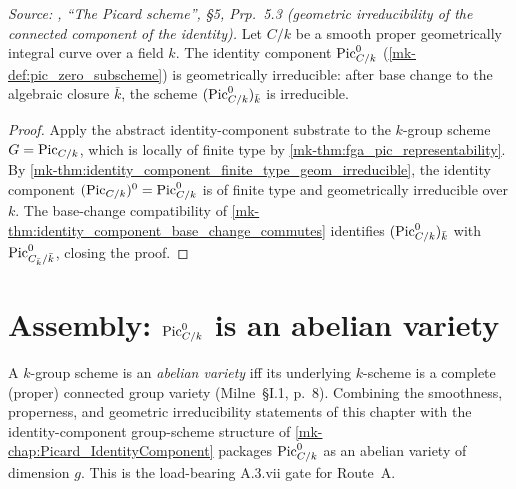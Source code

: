 \begin{theorem}\label{mk-thm:pic0_geom_irred}
  \leanok

  \textit{Source: \cite{kleiman-picard}, ``The Picard scheme'', \S 5, Prp.~5.3
  (geometric irreducibility of the connected component of the
  identity).}
  Let \(C/k\) be a smooth proper geometrically integral curve over a
  field \(k\). The identity component \(\operatorname{Pic}^0_{C/k}\)
  (\ref{mk-def:pic_zero_subscheme}) is geometrically irreducible: after
  base change to the algebraic closure \(\bar k\), the scheme
  \((\operatorname{Pic}^0_{C/k})_{\bar k}\) is irreducible.
\end{theorem}

\begin{proof}
  \leanok{}
  Apply the abstract identity-component substrate to the \(k\)-group
  scheme \(G = \operatorname{Pic}_{C/k}\), which is locally of finite type by
  \ref{mk-thm:fga_pic_representability}. By
  \ref{mk-thm:identity_component_finite_type_geom_irreducible}, the
  identity component \((\operatorname{Pic}_{C/k})^0 = \operatorname{Pic}^0_{C/k}\) is of finite
  type and geometrically irreducible over \(k\). The base-change
  compatibility of
  \ref{mk-thm:identity_component_base_change_commutes} identifies
  \((\operatorname{Pic}^0_{C/k})_{\bar k}\) with \(\operatorname{Pic}^0_{C_{\bar k}/\bar k}\),
  closing the proof.
\end{proof}

\section{Assembly: \(\operatorname{Pic}^0_{C/k}\) is an abelian variety}
\label{mk-sec:pic0_isAbelianVariety}

A \(k\)-group scheme is an \emph{abelian variety} iff its underlying
\(k\)-scheme is a complete (proper) connected group variety
(Milne~\S I.1, p.~8). Combining the smoothness, properness, and
geometric irreducibility statements of this chapter with the
identity-component group-scheme structure of
\ref{mk-chap:Picard_IdentityComponent} packages \(\operatorname{Pic}^0_{C/k}\) as an
abelian variety of dimension \(g\). This is the load-bearing A.3.vii
gate for Route~A.

